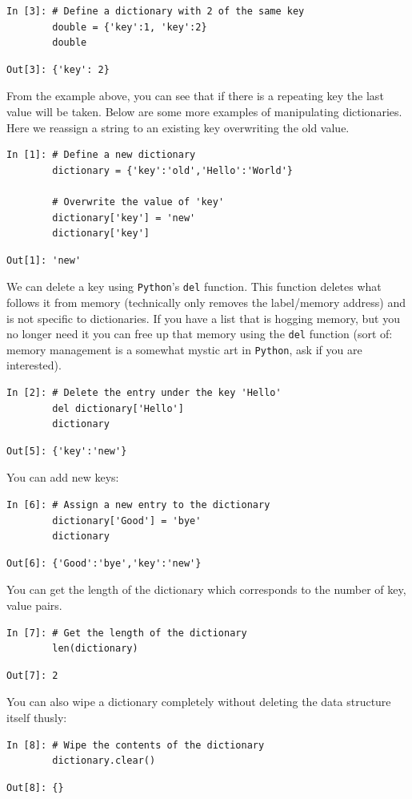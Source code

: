 \begin{lstlisting}[style=PY]
In [3]: # Define a dictionary with 2 of the same key
        double = {'key':1, 'key':2}
        double
\end{lstlisting}
\begin{lstlisting}[style=PY_out]
Out[3]: {'key': 2}
\end{lstlisting}
From the example above, you can see that if there is a repeating key the last value will be taken. Below are some more examples of manipulating dictionaries.
Here we reassign a string to an existing key overwriting the old value.
\begin{lstlisting}[style=PY]
In [1]: # Define a new dictionary
        dictionary = {'key':'old','Hello':'World'}
        
        # Overwrite the value of 'key'
        dictionary['key'] = 'new'
        dictionary['key']
\end{lstlisting}
\begin{lstlisting}[style=PY_out]
Out[1]: 'new'
\end{lstlisting}
We can delete a key using \texttt{Python}'s \texttt{del} function. This function deletes what follows it from memory (technically only removes the label/memory address) and is not specific to dictionaries. If you have a list that is hogging memory, but you no longer need it you can free up that memory using the \texttt{del} function (sort of: memory management is a somewhat mystic art in \texttt{Python}, ask if you are interested).
\begin{lstlisting}[style=PY]
In [2]: # Delete the entry under the key 'Hello'
        del dictionary['Hello']
        dictionary
\end{lstlisting}
\begin{lstlisting}[style=PY_out]
Out[5]: {'key':'new'}
\end{lstlisting}
You can add new keys:
\begin{lstlisting}[style=PY]
In [6]: # Assign a new entry to the dictionary
        dictionary['Good'] = 'bye'
        dictionary
\end{lstlisting}
\begin{lstlisting}[style=PY_out]
Out[6]: {'Good':'bye','key':'new'}
\end{lstlisting}
You can get the length of the dictionary which corresponds to the number of key, value pairs.
\begin{lstlisting}[style=PY]
In [7]: # Get the length of the dictionary
        len(dictionary)
\end{lstlisting}
\begin{lstlisting}[style=PY_out]
Out[7]: 2
\end{lstlisting}
You can also wipe a dictionary completely without deleting the data structure itself thusly:
\begin{lstlisting}[style=PY]
In [8]: # Wipe the contents of the dictionary
        dictionary.clear()
\end{lstlisting}
\begin{lstlisting}[style=PY_out]
Out[8]: {}
\end{lstlisting}

